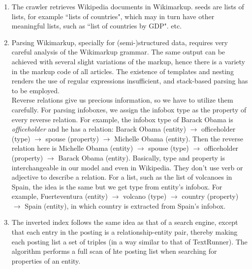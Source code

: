 \documentclass[11pt,twocolumn]{article}
\begin{document}
\begin{enumerate}


\item
The crawler retrieves Wikipedia documents in Wikimarkup. seeds are lists of lists, for example ``lists of countries", which may in turn have other meaningful lists, such as ``list of countries by GDP". etc.

\item 

Parsing Wikimarkup, specially for (semi-)structured data, requires very careful analysis of the Wikimarkup grammar. The same output can be achieved with several slight variations of the markup, hence there is a variety in the markup code of all articles. The existence of templates and nesting renders the use of regular expressions insufficient, and stack-based parsing has to be employed.\\


Reverse relations give us  precious information, so we have to utilize them carefully. For parsing infoboxes, we assign the infobox type as the property of every reverse relation. For example, the infobox type of Barack Obama is \emph{officeholder} and he has a relation: Barack Obama (entity) $\rightarrow$ officeholder (type) $\rightarrow$ spouse (property) $\rightarrow$ Michelle Obama (entity). Then the reverse relation here is Michelle Obama (entity) $\rightarrow$ spouse (type) $\rightarrow$ officeholder (property) $\rightarrow$ Barack Obama (entity). Basically, type and property is interchangeable in our model and even in Wikipedia. They don't use verb or adjective to describe a relation. For a list, such as the list of volcanoes in Spain, the idea is the same but we get type from entity's infobox. For example, Fuerteventura (entity) $\rightarrow$ volcano (type) $\rightarrow$ country (property) $\rightarrow$ Spain (entity), in which country is extracted from Spain's infobox.


\item
The inverted index follows the same idea as that of a search engine, except that each entry in the posting is a relationship-entity pair, thereby making each posting list a set of triples (in a way similar to that of TextRunner). The algorithm performs a full scan of hte posting list when searching for properties of an entity.\\
\end{enumerate}
\end{document}
